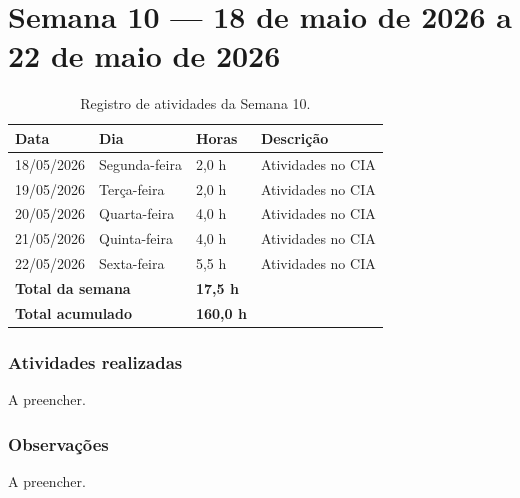 
\section{Semana 10 --- 18 de maio de 2026 a 22 de maio de 2026}

\begin{table}[H]
\centering
\caption{Registro de atividades da Semana 10.}
\begin{tabular}{llll}
\toprule
\textbf{Data} & \textbf{Dia} & \textbf{Horas} & \textbf{Descrição} \\
\midrule
18/05/2026 & Segunda-feira & 2,0 h & Atividades no CIA \\
19/05/2026 & Terça-feira & 2,0 h & Atividades no CIA \\
20/05/2026 & Quarta-feira & 4,0 h & Atividades no CIA \\
21/05/2026 & Quinta-feira & 4,0 h & Atividades no CIA \\
22/05/2026 & Sexta-feira & 5,5 h & Atividades no CIA \\
\midrule
\multicolumn{2}{l}{\textbf{Total da semana}} & \textbf{17,5 h} & \\
\multicolumn{2}{l}{\textbf{Total acumulado}} & \textbf{160,0 h} & \\
\bottomrule
\end{tabular}
\end{table}

\subsubsection*{Atividades realizadas}

A preencher.

\subsubsection*{Observações}

A preencher.
